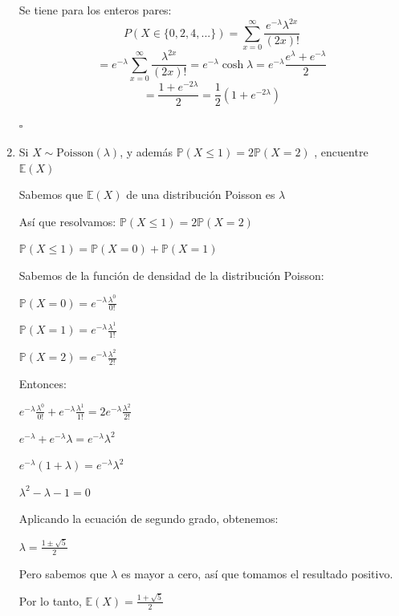 \documentclass[11pt,a4paper]{report}
\begin{document}
\begin{enumerate}
{\begin{enumerate}
{					Se tiene para los enteros pares:
						$$P(X \in \{0,2,4,...\}) = \sum_{x=0}^{\infty}
						  \frac{e^{-\lambda} \lambda^{2x}}{(2x)!}$$
						$$ = e^{-\lambda }\sum_{x=0}^{\infty}
						  \frac{\lambda^{2x}}{(2x)!}
						  = e^{-\lambda } \cosh \lambda
						  = e^{-\lambda } \frac{e^{\lambda} + e^{-\lambda}}
						    {2} $$
						$$ = \frac{1 + e^{-2\lambda}}{2}
						   = \frac{1}{2}(1 + e^{-2\lambda})$$
														   \begin{flushright}
															  $\square$
															\end{flushright}
				}
			\end{enumerate}
		}

		\item{
			Si $X \sim \text{Poisson}(\lambda)$, y además $\mathbb{P}(X \leq 1)
			= 2\mathbb{P}(X = 2)$ , encuentre $\mathbb{E}(X)$

			Sabemos que $\mathbb{E}(X)$ de una distribución Poisson es $\lambda$

			Así que resolvamos: $\mathbb{P}(X \leq 1) = 2\mathbb{P}(X = 2)$

			$\mathbb{P}(X \leq 1) = \mathbb{P}(X = 0) + \mathbb{P}(X = 1)$

			Sabemos de la función de densidad de la distribución Poisson:

			$\mathbb{P}(X = 0) = e^{-\lambda} \frac{\lambda^{0}}{0!}$

			$\mathbb{P}(X = 1) = e^{-\lambda} \frac{\lambda^{1}}{1!}$

			$\mathbb{P}(X = 2) = e^{-\lambda} \frac{\lambda^{2}}{2!}$

			Entonces:

			$e^{-\lambda} \frac{\lambda^{0}}{0!} + e^{-\lambda} \frac{\lambda^{1}}{1!} = 2 e^{-\lambda} \frac{\lambda^{2}}{2!}$

			$e^{-\lambda}  + e^{-\lambda} \lambda =  e^{-\lambda} \lambda^{2}$

			$e^{-\lambda} (1 + \lambda) =  e^{-\lambda} \lambda^{2}$

			 $\lambda^{2} - \lambda - 1 = 0$

			 Aplicando la ecuación de segundo grado, obtenemos:

			 $\lambda = \frac{1 \pm \sqrt{5}}{2}$
			 
			 Pero sabemos que $\lambda$ es mayor a cero, así que tomamos el resultado positivo.

			 Por lo tanto, $ \mathbb{E}(X) = \frac{1 + \sqrt{5}}{2}$\\

}
\end{enumerate}
\end{document}
